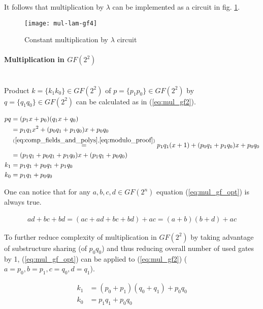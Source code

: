 It follows that multiplication by $\lambda$ can be implemented as a circuit in fig. \ref{fig:lambda_mul}.

\begin{figure}[!h]
\label{fig:lambda_mul}
\centering
\texttt{[image: mul-lam-gf4]}
\caption{Constant multiplication by $\lambda$ circuit}
\end{figure}


\paragraph{Multiplication in $GF(2^2)$}\mbox{}\\
Product $k = \{k_1k_0\} \in GF(2^2)$ of $p = \{p_1p_0\} \in GF(2^2)$ by $q = \{q_1q_0\} \in GF(2^2)$ can be calculated as in (\ref{eq:mul_gf2}).

\begin{equation}
\label{eq:mul_gf2}
\begin{aligned}
pq &= (p_1x + p_0)(q_1x + q_0)\\
&= p_1q_1x^2 + (p_0q_1 + p_1q_0)x + p_0q_0\\
&\stackrel{(\ref{eq:comp_fields_and_polys}, \ref{eq:modulo_proof})}{=}
p_1q_1(x + 1) + (p_0q_1 + p_1q_0)x + p_0q_0\\
&=(p_1q_1 + p_0q_1 + p_1q_0)x + (p_1q_1 + p_0q_0)\\
k_1 &= p_1q_1 + p_0q_1 + p_1q_0\\
k_0 &= p_1q_1 + p_0q_0
\end{aligned}
\end{equation}

One can notice that for any $a, b, c, d \in GF(2^n)$ equation (\ref{eq:mul_gf_opt}) is always true.

\begin{equation}
\label{eq:mul_gf_opt}
\begin{aligned}
ad + bc + bd = (ac + ad + bc + bd) + ac = (a + b)(b + d) + ac
\end{aligned}
\end{equation}

To further reduce complexity of multiplication in $GF(2^2)$ by taking advantage of substructure sharing (of $p_0q_0$) and thus reducing overall number of used gates by 1, (\ref{eq:mul_gf_opt}) can be applied to (\ref{eq:mul_gf2}) ($a = p_0, b = p_1, c = q_0, d = q_1$).

\begin{equation}
\label{eq:mul_gf2_final}
\begin{aligned}
k_1 &= (p_0 + p_1)(q_0 + q_1) + p_0q_0\\
k_0 &= p_1q_1 + p_0q_0
\end{aligned}
\end{equation}


